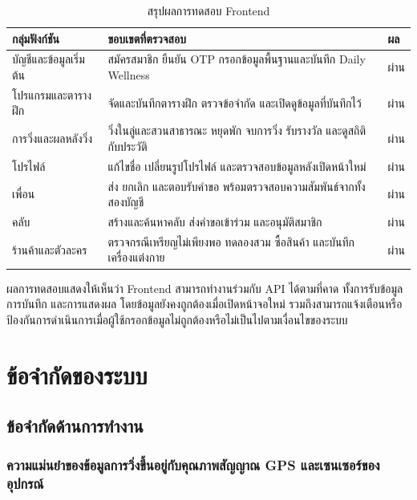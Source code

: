 \begin{table}[H]
\centering
\caption{สรุปผลการทดสอบ Frontend}
\label{tab:frontend-test-summary}
\small
\begingroup
\setlength{\tabcolsep}{4pt}
\renewcommand{\arraystretch}{1.15}
\begin{tabular}{|>{\raggedright\arraybackslash}p{}|>{\raggedright\arraybackslash}p{}|>{\centering\arraybackslash}p{}|}
\hline
\textbf{กลุ่มฟังก์ชัน} & \textbf{ขอบเขตที่ตรวจสอบ} & \textbf{ผล} \\ \hline
บัญชีและข้อมูลเริ่มต้น & สมัครสมาชิก ยืนยัน OTP กรอกข้อมูลพื้นฐานและบันทึก Daily Wellness & ผ่าน \\ \hline
โปรแกรมและตารางฝึก & จัดและบันทึกตารางฝึก ตรวจข้อจำกัด และเปิดดูข้อมูลที่บันทึกไว้ & ผ่าน \\ \hline
การวิ่งและผลหลังวิ่ง & วิ่งในลู่และสวนสาธารณะ หยุดพัก จบการวิ่ง รับรางวัล และดูสถิติกับประวัติ & ผ่าน \\ \hline
โปรไฟล์ & แก้ไขชื่อ เปลี่ยนรูปโปรไฟล์ และตรวจสอบข้อมูลหลังเปิดหน้าใหม่ & ผ่าน \\ \hline
เพื่อน & ส่ง ยกเลิก และตอบรับคำขอ พร้อมตรวจสอบความสัมพันธ์จากทั้งสองบัญชี & ผ่าน \\ \hline
คลับ & สร้างและค้นหาคลับ ส่งคำขอเข้าร่วม และอนุมัติสมาชิก & ผ่าน \\ \hline
ร้านค้าและตัวละคร & ตรวจกรณีเหรียญไม่เพียงพอ ทดลองสวม ซื้อสินค้า และบันทึกเครื่องแต่งกาย & ผ่าน \\ \hline
\end{tabular}
\endgroup
\end{table}

ผลการทดสอบแสดงให้เห็นว่า Frontend สามารถทำงานร่วมกับ API ได้ตามที่คาด ทั้งการรับข้อมูล การบันทึก และการแสดงผล โดยข้อมูลยังคงถูกต้องเมื่อเปิดหน้าจอใหม่ รวมถึงสามารถแจ้งเตือนหรือป้องกันการดำเนินการเมื่อผู้ใช้กรอกข้อมูลไม่ถูกต้องหรือไม่เป็นไปตามเงื่อนไขของระบบ

\section{ข้อจำกัดของระบบ}

\subsection{ข้อจำกัดด้านการทำงาน}
\subsubsection{ความแม่นยำของข้อมูลการวิ่งขึ้นอยู่กับคุณภาพสัญญาณ GPS และเซนเซอร์ของอุปกรณ์}
